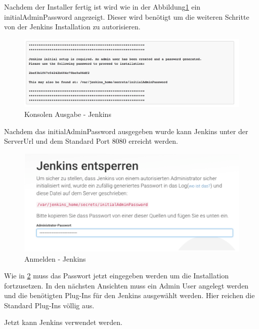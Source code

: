 Nachdem der Installer fertig ist wird wie in der Abbildung\ref{img:consoleoutput} ein initialAdminPassword angezeigt. Dieser wird benötigt um die weiteren Schritte von der Jenkins Installation zu autorisieren.

\begin{figure}[h]
\centering
\includegraphics[width=1\textwidth]{images/09_CI/consoleOutput.png}
\caption{Konsolen Ausgabe - Jenkins}
\label{img:consoleoutput}
\end{figure}

Nachdem das initialAdminPassword ausgegeben wurde kann Jenkins unter der ServerUrl  und dem Standard Port 8080 erreicht werden. 

\begin{figure}[h]
\centering
\includegraphics[width=1\textwidth]{images/09_CI/initial.png}
\caption{Anmelden - Jenkins}
\label{img:login}
\end{figure}

Wie in \ref{img:login} muss das Passwort jetzt eingegeben werden um die Installation fortzusetzen. In den nächsten Ansichten muss ein Admin User angelegt werden und die benötigten Plug-Ins für den Jenkins ausgewählt werden. Hier reichen die Standard Plug-Ins völlig aus.

Jetzt kann Jenkins verwendet werden.